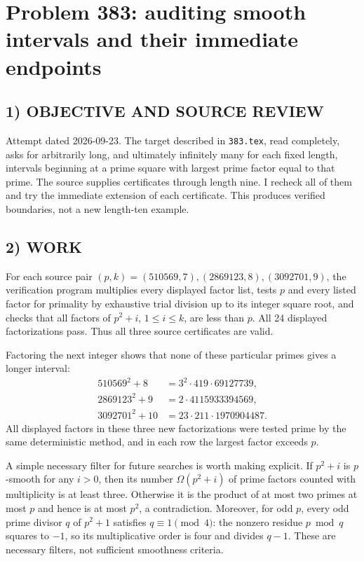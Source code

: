 \section{Problem 383: auditing smooth intervals and their immediate endpoints}
\subsection*{1) OBJECTIVE AND SOURCE REVIEW}
Attempt dated 2026-09-23. The target described in \texttt{383.tex}, read completely, asks for arbitrarily long, and ultimately infinitely many for each fixed length, intervals beginning at a prime square with largest prime factor equal to that prime. The source supplies certificates through length nine. I recheck all of them and try the immediate extension of each certificate. This produces verified boundaries, not a new length-ten example.
\subsection*{2) WORK}
For each source pair $(p,k)=(510569,7),(2869123,8),(3092701,9)$, the verification program multiplies every displayed factor list, tests $p$ and every listed factor for primality by exhaustive trial division up to its integer square root, and checks that all factors of $p^2+i$, $1\le i\le k$, are less than $p$. All 24 displayed factorizations pass. Thus all three source certificates are valid.

Factoring the next integer shows that none of these particular primes gives a longer interval:
\[
\begin{split}
510569^2+8&=3^2\cdot419\cdot69127739,\\
2869123^2+9&=2\cdot4115933394569,\\
3092701^2+10&=23\cdot211\cdot1970904487.
\end{split}
\]
All displayed factors in these three new factorizations were tested prime by the same deterministic method, and in each row the largest factor exceeds $p$.

A simple necessary filter for future searches is worth making explicit. If $p^2+i$ is $p$-smooth for any $i>0$, then its number $\Omega(p^2+i)$ of prime factors counted with multiplicity is at least three. Otherwise it is the product of at most two primes at most $p$ and hence is at most $p^2$, a contradiction. Moreover, for odd $p$, every odd prime divisor $q$ of $p^2+1$ satisfies $q\equiv1\pmod4$: the nonzero residue $p\bmod q$ squares to $-1$, so its multiplicative order is four and divides $q-1$. These are necessary filters, not sufficient smoothness criteria.
